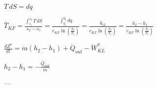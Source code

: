 \( T \, dS = dq \)  

\( \bar{T}_{KF} = \frac{\int_{s_1}^{s_2} T \, dS}{s_2 - s_1} = \frac{\int_{q_1}^{q_2} dq}{c_{KF} \ln \left( \frac{T_2}{T_1} \right)} = \frac{q_{12}}{c_{KF} \ln \left( \frac{T_2}{T_1} \right)} = \frac{h_2 - h_1}{c_{KF} \ln \left( \frac{T_2}{T_1} \right)} \)  

\( \frac{dZ^o}{dt} = \dot{m} (h_2 - h_1) + \dot{Q}_{out} - \dot{W}^o_{KL} \)  

\( h_2 - h_1 = - \frac{\dot{Q}_{out}}{\dot{m}} \)  

---